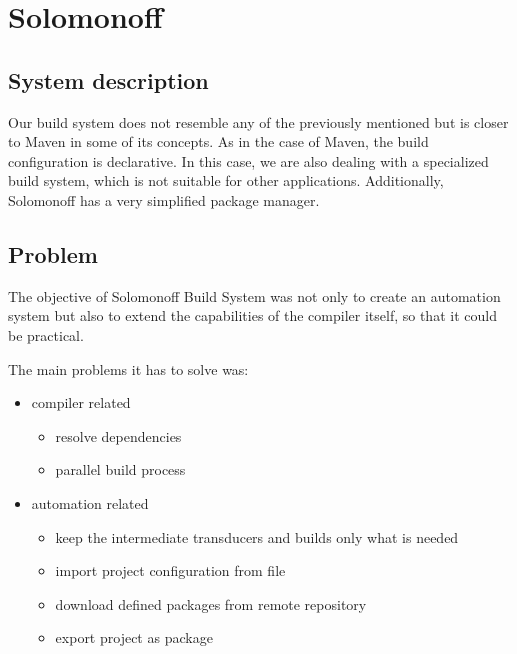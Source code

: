 \hypertarget{solomonoff}{%
\section{Solomonoff}\label{solomonoff}}

\hypertarget{system-description}{%
\subsection{System description}\label{system-description}}

Our build system does not resemble any of the previously mentioned but
is closer to Maven in some of its concepts. As in the case of Maven, the
build configuration is declarative. In this case, we are also dealing
with a specialized build system, which is not suitable for other
applications. Additionally, Solomonoff has a very simplified package
manager.

\hypertarget{problem}{%
\subsection{Problem}\label{problem}}

The objective of Solomonoff Build System was not only to create an automation
system but also to extend the capabilities of the compiler itself, so
that it could be practical.

The main problems it has to solve was:

\begin{itemize}
\item
  compiler related

  \begin{itemize}
  \item
    resolve dependencies
  \item
    parallel build process
  \end{itemize}
\item
  automation related

  \begin{itemize}
  \item
    keep the intermediate transducers and builds only what is needed
  \item
    import project configuration from file
  \item
    download defined packages from remote repository
  \item
    export project as package
  \end{itemize}
\end{itemize}

